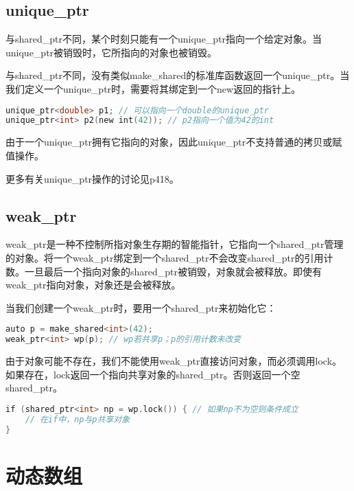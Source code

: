 \documentclass[
  a4paper,
  oneside,tablecaptionabove
]{scrbook}
\begin{document}
\subsection{unique\_ptr}\label{unique_ptr}

与shared\_ptr不同，某个时刻只能有一个unique\_ptr指向一个给定对象。当unique\_ptr被销毁时，它所指向的对象也被销毁。

与shared\_ptr不同，没有类似make\_shared的标准库函数返回一个unique\_ptr。当我们定义一个unique\_ptr时，需要将其绑定到一个new返回的指针上。

\begin{lstlisting}[language={C++}]
unique_ptr<double> p1; // 可以指向一个double的unique_ptr
unique_ptr<int> p2(new int(42)); // p2指向一个值为42的int
\end{lstlisting}

由于一个unique\_ptr拥有它指向的对象，因此unique\_ptr不支持普通的拷贝或赋值操作。

更多有关unique\_ptr操作的讨论见p418。

\subsection{weak\_ptr}\label{weak_ptr}

weak\_ptr是一种不控制所指对象生存期的智能指针，它指向一个shared\_ptr管理的对象。将一个weak\_ptr绑定到一个shared\_ptr不会改变shared\_ptr的引用计数。一旦最后一个指向对象的shared\_ptr被销毁，对象就会被释放。即使有weak\_ptr指向对象，对象还是会被释放。

当我们创建一个weak\_ptr时，要用一个shared\_ptr来初始化它：

\begin{lstlisting}[language={C++}]
auto p = make_shared<int>(42);
weak_ptr<int> wp(p); // wp若共享p；p的引用计数未改变
\end{lstlisting}

由于对象可能不存在，我们不能使用weak\_ptr直接访问对象，而必须调用lock。如果存在，lock返回一个指向共享对象的shared\_ptr。否则返回一个空shared\_ptr。

\begin{lstlisting}[language={C++}]
if (shared_ptr<int> np = wp.lock()) { // 如果np不为空则条件成立
    // 在if中，np与p共享对象
}
\end{lstlisting}

\section{动态数组}\label{ux52a8ux6001ux6570ux7ec4}
\end{document}
